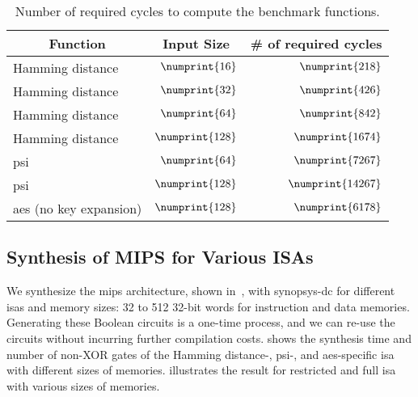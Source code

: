 \begin{table}
\centering
\caption{Number of required cycles to compute the benchmark functions.}\label{tab:cyc_bench}
\begin{tabular}{l||r|r}
\multicolumn{1}{c||}{Function} & \multicolumn{1}{c|}{Input Size} &  \multicolumn{1}{c}{\# of required cycles} \\
\hline
\hline
Hamming distance & $\numprint{16}$ & $\numprint{218}$\\
\hline
 Hamming distance & $\numprint{32}$ & $\numprint{426}$\\
\hline
Hamming distance & $\numprint{64}$ & $\numprint{842}$\\
\hline
Hamming distance & $\numprint{128}$ & $\numprint{1674}$\\
\hline
\acrshort{psi} & $\numprint{64}$ &$\numprint{7267}$\\
\hline
\acrshort{psi} & $\numprint{128}$ &$\numprint{14267}$\\
\hline
\acrshort{aes} (no key expansion) & $\numprint{128}$ & $\numprint{6178}$\\
\end{tabular}
\end{table}

\subsection{Synthesis of MIPS for Various ISAs}\label{ssect:eval-mips-sfe-isa}
We synthesize the \gls{mips} architecture, shown in~, with \gls{synopsys-dc} for different \acrshort{isa}s and memory sizes: 32 to 512 32-bit words for instruction and data memories.
Generating these Boolean circuits is a one-time process, and we can re-use the circuits without incurring further compilation costs.
 shows the synthesis time and number of non-XOR gates of the Hamming distance-, \acrshort{psi}-, and \acrshort{aes}-specific \acrshort{isa} with different sizes of memories.
 illustrates the result for restricted and full \acrshort{isa} with various sizes of memories.


